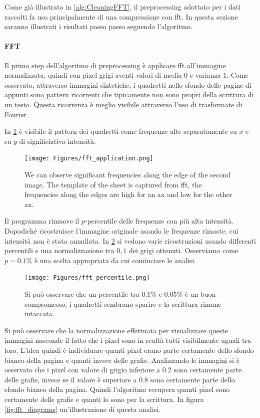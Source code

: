 \begin{toDo}
    \noindent Come già illustrato in \cref{alg:CleaningFFT}, il preprocessing adottato per i dati raccolti fa uso principalmente di una compressione con \gls{fft}. In questa sezione saranno illustrati i risultati passo passo seguendo l'algoritmo.

    \paragraph{FFT}
    Il primo step dell'algoritmo di preprocessing è applicare \gls{fft} all'immagine normalizzata, quindi con pixel grigi aventi valori di media $0$ e varianza $1$. Come osservato, attraverso immagini sintetiche, i quadretti nello sfondo delle pagine di appunti sono pattern ricorrenti che tipicamente non sono propri della scrittura di un testo. Questa ricorrenza è meglio visibile attraverso l'uso di trasformate di Fourier.

   	\noindent In \cref{fig:fft_application} è visibile il pattern dei quadretti come frequenze alte separatamente su $x$ e su $y$ di significiativa intensità.

    \begin{figure}[h]
    	\centering
    	\texttt{[image: Figures/fft\_application.png]}
    	\caption[fft application]{We can observe significant frequencies along the edge of the second image. The template of the sheet is captured from \gls{fft}, the frequencies along the edges are high for an ax and low for the other ax.}
    	\label{fig:fft_application}
    \end{figure}

	\noindent Il programma rimuove il $p$-percentile delle frequenze con più alta intensità. Dopodiché ricostruisce l'immagine originale usando le frequenze rimaste, cui intensità non è stata annullata. In \cref{fig:fft_percentile} si vedono varie ricostruzioni usando differenti percentili e una normalizzazione tra $0,1$ dei grigi ottenuti. Osserviamo come $p=0.1\%$ è una scelta appropriata da cui cominciare le analisi.

	\begin{figure}[h]
		\centering
		\texttt{[image: Figures/fft\_percentile.png]}
		\caption[comparing different percentiles in fft]{Si può osservare che un percentile tra $0.1\%$ e $0.05\%$ è un buon compromesso, i quadretti sembrano sparire e la scrittura rimane intaccata.}
		\label{fig:fft_percentile}
	\end{figure}

	\noindent Si può osservare che la normalizzazione effettuata per visualizzare queste immagini nasconde il fatto che i pixel sono in realtà tutti visibilmente uguali tra loro. L'idea quindi è individuare quanti pixel erano parte certamente dello sfondo bianco della pagina e quanti invece delle grafie. Analizzando le immagini si è osservato che i pixel con valore di grigio inferiore a $0.2$ sono certamente parte delle grafie, invece se il valore è superiore a $0.8$ sono certamente parte dello sfondo bianco della pagina. Quindi l'algoritmo recupera quanti pixel sono certamente delle grafie e quanti lo sono per la scrittura. In figura \cref{fig:fft_diagrams} un'illustrazione di questa analisi.


\end{toDo}
